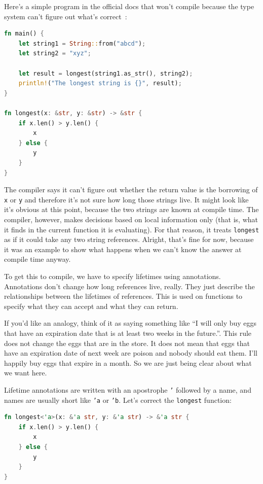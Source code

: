 \documentclass[a4paper]{report}
\begin{document}
Here's a simple program in the official docs that won't compile because the type system can't figure out what's correct~\cite{rustdocs}:

\begin{lstlisting}[language=Rust]
fn main() {
    let string1 = String::from("abcd");
    let string2 = "xyz";

    let result = longest(string1.as_str(), string2);
    println!("The longest string is {}", result);
}

fn longest(x: &str, y: &str) -> &str {
    if x.len() > y.len() {
        x
    } else {
        y
    }
}
\end{lstlisting}

The compiler says it can't figure out whether the return value is the borrowing of \texttt{x} or \texttt{y} and therefore it's not sure how long those strings live. It might look like it's obvious at this point, because the two strings are known at compile time. The compiler, however, makes decisions based on local information only (that is, what it finds in the current function it is evaluating). For that reason, it treats \texttt{longest} as if it could take any two string references. Alright, that's fine for now, because it was an example to show what happens when we can't know the answer at compile time anyway.

To get this to compile, we have to specify lifetimes using annotations. Annotations don't change how long references live, really. They just describe the relationships between the lifetimes of references. This is used on functions to specify what they can accept and what they can return.

If you'd like an analogy, think of it as saying something like ``I will only buy eggs that have an expiration date that is at least two weeks in the future.''. This rule does not change the eggs that are in the store. It does not mean that eggs that have an expiration date of next week are poison and nobody should eat them. I'll happily buy eggs that expire in a month. So we are just being clear about what we want here.

Lifetime annotations are written with an apostrophe \texttt{'} followed by a name, and names are usually short like \texttt{'a} or \texttt{'b}. Let's correct the \texttt{longest} function:

\begin{lstlisting}[language=Rust]
fn longest<'a>(x: &'a str, y: &'a str) -> &'a str {
    if x.len() > y.len() {
        x
    } else {
        y
    }
}
\end{lstlisting}
\end{document}
